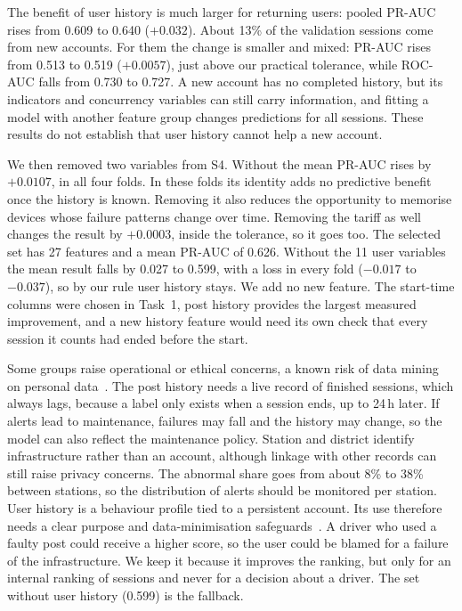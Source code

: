 \documentclass[12pt,a4paper,openany]{report}
\begin{document}
The benefit of user history is much larger for returning users: pooled \acs{PR-AUC} rises from 0.609 to 0.640
($+0.032$). About 13\% of the validation sessions come from new accounts. For them the change is smaller and
mixed: \acs{PR-AUC} rises from 0.513 to 0.519 ($+0.0057$), just above our practical tolerance, while
\acs{ROC-AUC} falls from 0.730 to 0.727. A new account has no completed history, but its indicators and concurrency
variables can still carry information, and fitting a model with another feature group changes predictions for all
sessions. These results do not establish that user history cannot help a new account.

We then removed two variables from S4. Without  the mean \acs{PR-AUC} rises by $+0.0107$, in all
four folds. In these folds its identity adds no predictive benefit once the history is known. Removing it also
reduces the opportunity to memorise devices whose failure patterns change over time. Removing the tariff as well
changes the result by $+0.0003$, inside the tolerance, so it goes too. The selected set has 27 features and a mean
\acs{PR-AUC} of 0.626. Without the 11 user variables the mean result falls by 0.027 to 0.599, with a loss in every
fold ($-0.017$ to $-0.037$), so by our rule user history stays. We add no new feature. The start-time columns were
chosen in Task~1, post history provides the largest measured improvement, and a new history feature would need its
own check that every session it counts had ended before the start.

Some groups raise operational or ethical concerns, a known risk of data mining on personal data~\cite{mindd01}. The post history needs a live record of finished sessions,
which always lags, because a label only exists when a session ends, up to 24\,h later. If alerts lead to
maintenance, failures may fall and the history may change, so the model can also reflect the maintenance policy.
Station and district identify infrastructure rather than an account, although linkage with other records can still
raise privacy concerns. The abnormal share goes from about 8\% to 38\% between stations, so the distribution of
alerts should be monitored per station. User history is a behaviour profile tied to a persistent account. Its use
therefore needs a clear purpose and data-minimisation safeguards~\cite{gdpr}. A driver who used a faulty post could
receive a higher score, so the user could be blamed for a failure of the infrastructure. We keep it
because it improves the ranking, but only for an internal ranking of sessions and never for a decision about a
driver. The set without user history (0.599) is the fallback.
\end{document}
